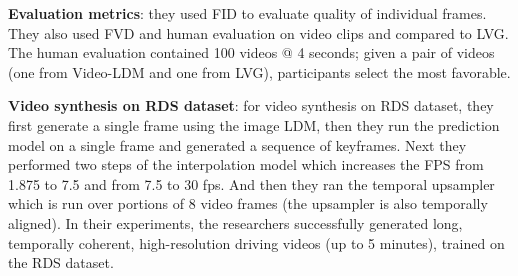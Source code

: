 \textbf{Evaluation metrics}: they used FID to evaluate quality of individual frames. They also used FVD and human evaluation on video clips and compared to LVG. The human evaluation contained 100 videos @ 4 seconds; given a pair of videos (one from Video-LDM and one from LVG), participants select the most favorable.

\textbf{Video synthesis on RDS dataset}: for video synthesis on RDS dataset, they first generate a single frame using the image LDM, then they run the prediction model on a single frame and generated a sequence of keyframes. Next they performed two steps of the interpolation model which increases the FPS from 1.875 to 7.5 and from 7.5 to 30 fps. And then they ran the temporal upsampler which is run over portions of 8 video frames (the upsampler is also temporally aligned). In their experiments, the researchers successfully generated long, temporally coherent, high-resolution driving videos (up to 5 minutes), trained on the RDS dataset.

